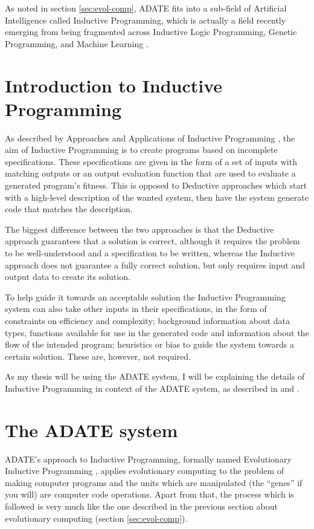 As noted in section \ref{sec:evol-comp}, ADATE \citep{olsson1995inductive} fits
into a sub-field of Artificial Intelligence called Inductive Programming, which is
actually a field recently emerging from being fragmented across Inductive Logic
Programming, Genetic Programming, and Machine Learning
\citep{kitzelmann2010inductive}.

\section{Introduction to Inductive Programming}
\label{sec:intr-induct-progr}

As described by Approaches and Applications of Inductive Programming
\citep{aaip2010intro}, the aim of Inductive Programming is to create programs
based on incomplete specifications. These specifications are given in the form
of a set of inputs with matching outputs or an output evaluation function that
are used to evaluate a generated program's fitness. This is opposed to Deductive
approaches which start with a high-level description of the wanted system, then
have the system generate code that matches the description.

The biggest difference between the two approaches is that the Deductive approach
guarantees that a solution is correct, although it requires the problem to be
well-understood and a specification to be written, whereas the Inductive
approach does not guarantee a fully correct solution, but only requires input
and output data to create its solution.

To help guide it towards an acceptable solution the Inductive Programming system
can also take other inputs in their specifications, in the form of constraints
on efficiency and complexity; background information about data types, functions
available for use in the generated code and information about the flow of the
intended program; heuristics or bias to guide the system towards a certain
solution. These are, however, not required.

As my thesis will be using the ADATE system, I will be explaining the details of
Inductive Programming in context of the ADATE system, as described in
\citet{olsson1994inductive} and \citet{vattekar2006adate}.

\section{The ADATE system}
\label{sec:adate-system}

ADATE's approach to Inductive Programming, formally named Evolutionary Inductive
Programming \citep{crossleycombining}, applies evolutionary computing to the
problem of making computer programs and the units which are manipulated (the
``genes'' if you will) are computer code operations. Apart from that, the
process which is followed is very much like the one described in the previous
section about evolutionary computing (section \ref{sec:evol-comp}).

